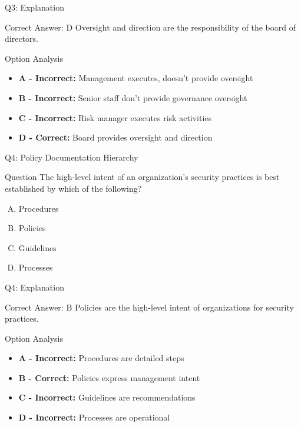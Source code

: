 \documentclass{beamer}
\begin{document}
	\begin{frame}{Q3: Explanation}
		\begin{block}{Correct Answer: D}
			Oversight and direction are the responsibility of the board of directors.
		\end{block}
		\begin{block}{Option Analysis}
			\begin{itemize}
				\item \textbf{A - Incorrect:} Management executes, doesn't provide oversight
				\item \textbf{B - Incorrect:} Senior staff don't provide governance oversight
				\item \textbf{C - Incorrect:} Risk manager executes risk activities
				\item \textbf{D - Correct:} Board provides oversight and direction
			\end{itemize}
		\end{block}
	\end{frame}
	
	\begin{frame}{Q4: Policy Documentation Hierarchy}
		\begin{block}{Question}
			The high-level intent of an organization's security practices is best established by which of the following?
		\end{block}
		\begin{enumerate}[(A)]
			\item Procedures
			\item Policies
			\item Guidelines
			\item Processes
		\end{enumerate}
	\end{frame}
	
	\begin{frame}{Q4: Explanation}
		\begin{block}{Correct Answer: B}
			Policies are the high-level intent of organizations for security practices.
		\end{block}
		\begin{block}{Option Analysis}
			\begin{itemize}
				\item \textbf{A - Incorrect:} Procedures are detailed steps
				\item \textbf{B - Correct:} Policies express management intent
				\item \textbf{C - Incorrect:} Guidelines are recommendations
				\item \textbf{D - Incorrect:} Processes are operational
			\end{itemize}
		\end{block}
	\end{frame}
	
\end{document}
